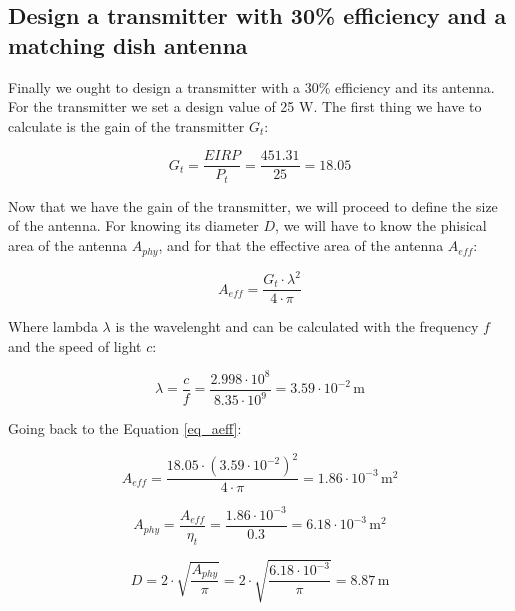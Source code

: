 \documentclass[a4paper,12pt,calibri,oneside,openany]{book}
\newcommand{\unit}[1]{\ensuremath{\, \mathrm{#1}}}
\theoremstyle{break}
\begin{document}
	\subsection{Design a transmitter with 30\% efficiency and a matching dish antenna}
	
		Finally we ought to design a transmitter with a 30\% efficiency and its antenna. For the transmitter we set a design value of 25 W. The first thing we have to calculate is the gain of the transmitter $G_{t}$:
		
		\begin{equation} \label{eq_gt}
			G_{t} = \dfrac{EIRP}{P_{t}}= \dfrac{451.31}{25} = 18.05
		\end{equation}
	
		Now that we have the gain of the transmitter, we will proceed to define the size of the antenna. For knowing its diameter $D$, we will have to know the phisical area of the antenna $A_{phy}$, and for that the effective area of the antenna $A_{eff}$:
		
		\begin{equation} \label{eq_aeff}
			A_{eff} = \dfrac{G_{t} \cdot \lambda^{2}} {4 \cdot \pi }
		\end{equation}
	
		Where lambda $\lambda$ is the wavelenght and can be calculated with the frequency $f$ and the speed of light $c$:
		
		\begin{equation} \label{eq_lambda}
			\lambda = \dfrac{c} {f}= \dfrac{2.998 \cdot 10^{8}} {8.35 \cdot 10^{9}} = 3.59 \cdot 10^{-2} \unit{m}
		\end{equation}
	
		Going back to the Equation \ref{eq_aeff}:
		
		\begin{equation} \label{eq_aeff2}
			A_{eff} = \dfrac{{18.05} \cdot (3.59 \cdot 10^{-2})^{2}} {4 \cdot \pi } =  1.86 \cdot 10^{-3} \unit{m^{2}}
		\end{equation}
	
		\begin{equation} \label{eq_aphy}
			A_{phy} = \dfrac{A_{eff}} {\eta_{t}} = 
			\dfrac{1.86 \cdot 10^{-3}} {0.3}=
			6.18 \cdot 10^{-3} \unit{m^{2}}
		\end{equation}
		
		\begin{equation} \label{eq_d}
			D = 2 \cdot \sqrt{\dfrac{A_{phy}}{\pi}} =
			2 \cdot \sqrt{\dfrac{6.18 \cdot 10^{-3}}{\pi}} = 8.87  \unit{m}
		\end{equation}
	
\end{document}
